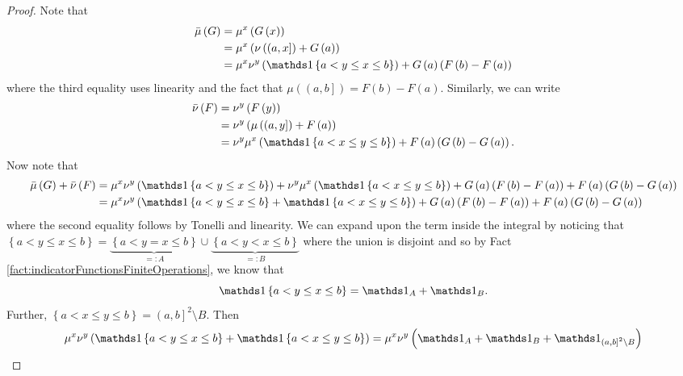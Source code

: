 \begin{proof}
Note that 
\begin{align*}
\lebInt{\mu}G & =\mu^{x}\left(G\left(x\right)\right)\\
 & =\mu^{x}\left(\nu\left(\left(a,x\right]\right)+G\left(a\right)\right)\\
 & =\mu^{x}\nu^{y}\left(\indicate\left\{ a<y\leq x\leq b\right\} \right)+G\left(a\right)\left(F\left(b\right)-F\left(a\right)\right)
\end{align*}
where the third equality uses linearity and the fact that $\mu\left(\left(a,b\right]\right)=F\left(b\right)-F\left(a\right).$
Similarly, we can write
\begin{align*}
\lebInt{\nu}F & =\nu^{y}\left(F\left(y\right)\right)\\
 & =\nu^{y}\left(\mu\left(\left(a,y\right]\right)+F\left(a\right)\right)\\
 & =\nu^{y}\mu^{x}\left(\indicate\left\{ a<x\leq y\leq b\right\} \right)+F\left(a\right)\left(G\left(b\right)-G\left(a\right)\right).
\end{align*}
Now note that
\begin{align}
\lebInt{\mu}G+\lebInt{\nu}F & =\mu^{x}\nu^{y}\left(\indicate\left\{ a<y\leq x\leq b\right\} \right)+\nu^{y}\mu^{x}\left(\indicate\left\{ a<x\leq y\leq b\right\} \right)+G\left(a\right)\left(F\left(b\right)-F\left(a\right)\right)+F\left(a\right)\left(G\left(b\right)-G\left(a\right)\right)\nonumber \\
 & =\mu^{x}\nu^{y}\left(\indicate\left\{ a<y\leq x\leq b\right\} +\indicate\left\{ a<x\leq y\leq b\right\} \right)+G\left(a\right)\left(F\left(b\right)-F\left(a\right)\right)+F\left(a\right)\left(G\left(b\right)-G\left(a\right)\right)\label{eq:muGPlusNuF}
\end{align}
where the second equality follows by Tonelli and linearity. We can
expand upon the term inside the integral by noticing that $\left\{ a<y\leq x\leq b\right\} =\underbrace{\left\{ a<y=x\leq b\right\} }_{=:A}\cup\underbrace{\left\{ a<y<x\leq b\right\} }_{=:B}$
where the union is disjoint and so by Fact \ref{fact:indicatorFunctionsFiniteOperations},
we know that 
\[
\indicate\left\{ a<y\leq x\leq b\right\} =\indicate_{A}+\indicate_{B}.
\]
Further, $\left\{ a<x\leq y\leq b\right\} =\left(a,b\right]^{2}\setminus B$.
Then
\begin{align}
\mu^{x}\nu^{y}\left(\indicate\left\{ a<y\leq x\leq b\right\} +\indicate\left\{ a<x\leq y\leq b\right\} \right) & =\mu^{x}\nu^{y}\left(\indicate_{A}+\indicate_{B}+\indicate_{\left(a,b\right]^{2}\setminus B}\right)\nonumber \\

\end{align}
\end{proof}
